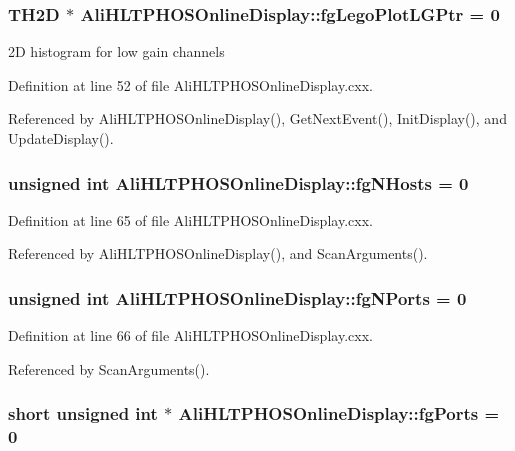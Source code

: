 \subsubsection{\setlength{\rightskip}{0pt plus 5cm}TH2D $\ast$ {\bf Ali\-HLTPHOSOnline\-Display::fg\-Lego\-Plot\-LGPtr} = 0\hspace{0.3cm}{\tt  [static, private]}}\label{classAliHLTPHOSOnlineDisplay_v38}


2D histogram for low gain channels 

Definition at line 52 of file Ali\-HLTPHOSOnline\-Display.cxx.

Referenced by Ali\-HLTPHOSOnline\-Display(), Get\-Next\-Event(), Init\-Display(), and Update\-Display().
\subsubsection{\setlength{\rightskip}{0pt plus 5cm}unsigned int {\bf Ali\-HLTPHOSOnline\-Display::fg\-NHosts} = 0\hspace{0.3cm}{\tt  [static, private]}}\label{classAliHLTPHOSOnlineDisplay_v49}




Definition at line 65 of file Ali\-HLTPHOSOnline\-Display.cxx.

Referenced by Ali\-HLTPHOSOnline\-Display(), and Scan\-Arguments().
\subsubsection{\setlength{\rightskip}{0pt plus 5cm}unsigned int {\bf Ali\-HLTPHOSOnline\-Display::fg\-NPorts} = 0\hspace{0.3cm}{\tt  [static, private]}}\label{classAliHLTPHOSOnlineDisplay_v50}




Definition at line 66 of file Ali\-HLTPHOSOnline\-Display.cxx.

Referenced by Scan\-Arguments().
\subsubsection{\setlength{\rightskip}{0pt plus 5cm}short unsigned int $\ast$ {\bf Ali\-HLTPHOSOnline\-Display::fg\-Ports} = 0\hspace{0.3cm}{\tt  [static, private]}}\label{classAliHLTPHOSOnlineDisplay_v56}




